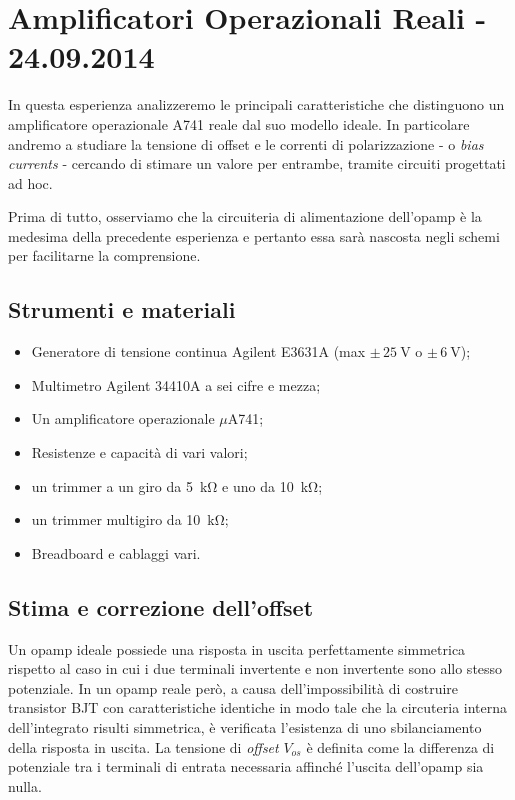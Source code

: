 \section{Amplificatori Operazionali Reali - 24.09.2014}

In questa esperienza analizzeremo le principali caratteristiche che distinguono un amplificatore operazionale \si{\micro}A741 reale dal suo modello ideale.
In particolare andremo a studiare la tensione di offset e le correnti di polarizzazione - o \textit{bias currents} - cercando di stimare un valore per entrambe, tramite circuiti progettati ad hoc.

Prima di tutto, osserviamo che la circuiteria di alimentazione dell'opamp è la medesima della precedente esperienza e pertanto essa sarà nascosta negli schemi per facilitarne la comprensione.

\subsection{Strumenti e materiali}

\begin{itemize} [noitemsep]
\item Generatore di tensione continua Agilent E3631A (max $\pm \, \SI{25}{\volt}$ o $\pm \, \SI{6}{\volt}$);
\item Multimetro Agilent 34410A a sei cifre e mezza;
\item Un amplificatore operazionale $\mu$A741;
\item Resistenze e capacità di vari valori;
\item un trimmer a un giro da \SI{5}{\kilo\ohm} e uno da \SI{10}{\kilo\ohm};
\item un trimmer multigiro da \SI{10}{\kilo\ohm};
\item Breadboard e cablaggi vari.
\end{itemize}

\subsection{Stima e correzione dell'offset}
\label{par2:offset}

Un opamp ideale possiede una risposta in uscita perfettamente simmetrica rispetto al caso in cui i due terminali invertente e non invertente sono allo stesso potenziale.
In un opamp reale però, a causa dell'impossibilità di costruire transistor BJT con caratteristiche identiche in modo tale che la circuteria interna dell'integrato risulti simmetrica, è verificata l'esistenza di uno sbilanciamento della risposta in uscita.
La tensione di \textit{offset} $V_{os}$ è definita come la differenza di potenziale tra i terminali di entrata necessaria affinché l'uscita dell'opamp sia nulla.

